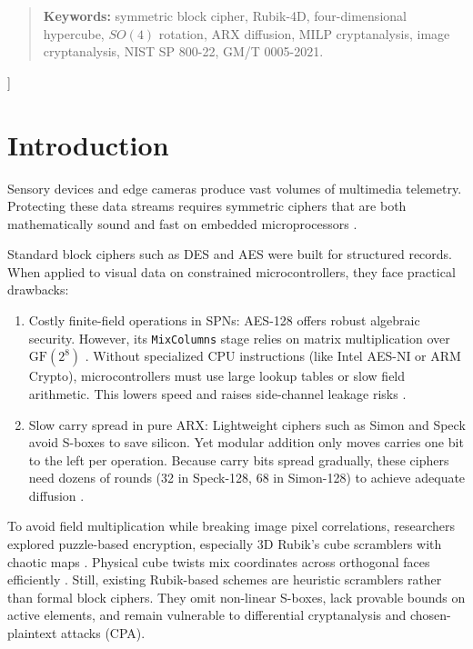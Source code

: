 \documentclass[10pt,twocolumn]{article}
\begin{document}
\begin{@twocolumnfalse}
\begin{quote}
      \noindent\textbf{Keywords:} symmetric block cipher, Rubik-4D, four-dimensional hypercube, $SO(4)$ rotation, ARX diffusion, MILP cryptanalysis, image cryptanalysis, NIST SP 800-22, GM/T 0005-2021.
    \end{quote}
    \vspace{0.6cm}
  \end{@twocolumnfalse}
]

\section{Introduction}
\label{sec:intro}
Sensory devices and edge cameras produce vast volumes of multimedia telemetry. Protecting these data streams requires symmetric ciphers that are both mathematically sound and fast on embedded microprocessors \cite{beierle2020alzette, beaulieu2015simon}.

Standard block ciphers such as DES and AES \cite{nist2001fips, daemen2002design} were built for structured records. When applied to visual data on constrained microcontrollers, they face practical drawbacks:
\begin{enumerate}
    \item Costly finite-field operations in SPNs: AES-128 offers robust algebraic security. However, its \texttt{MixColumns} stage relies on matrix multiplication over $\text{GF}(2^8)$ \cite{daemen2002design}. Without specialized CPU instructions (like Intel AES-NI or ARM Crypto), microcontrollers must use large lookup tables or slow field arithmetic. This lowers speed and raises side-channel leakage risks \cite{hadipour2023impossible, xiang2016milp}.
    \item Slow carry spread in pure ARX: Lightweight ciphers such as Simon and Speck \cite{beaulieu2015simon} avoid S-boxes to save silicon. Yet modular addition only moves carries one bit to the left per operation. Because carry bits spread gradually, these ciphers need dozens of rounds (32 in Speck-128, 68 in Simon-128) to achieve adequate diffusion \cite{beierle2020alzette}.
\end{enumerate}

To avoid field multiplication while breaking image pixel correlations, researchers explored puzzle-based encryption, especially 3D Rubik's cube scramblers with chaotic maps \cite{loukhaoukha2012rubik, qiu2022hyperchaotic, nair2024rubik}. Physical cube twists mix coordinates across orthogonal faces efficiently \cite{qiu2022hyperchaotic}. Still, existing Rubik-based schemes are heuristic scramblers rather than formal block ciphers. They omit non-linear S-boxes, lack provable bounds on active elements, and remain vulnerable to differential cryptanalysis and chosen-plaintext attacks (CPA).
\end{document}

